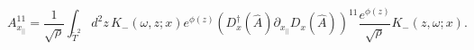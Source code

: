 \begin{equation}
A_{x_{||}}^{11}=\frac{1}{\sqrt{\rho}}
\int_{\tilde T^2} d^2z\,
K_-(\omega,z;x)e^{\phi(z)}
\left(
D^\dagger_x(\hat A)\partial_{x_{||}} D_x(\hat A)
\right)^{11}\frac{e^{\phi(z)}}{\sqrt{\rho}}K_-(z,\omega;x).
\end{equation}

